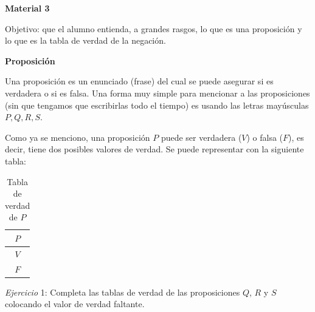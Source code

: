 \documentclass[letterpaper, twoside]{article}
\begin{document}
\begin{center}
  \textbf{\large Material 3}
\end{center}

\vspace{.5cm}

Objetivo: que el alumno entienda, a grandes rasgos, lo que es una proposición y lo que es la tabla de verdad de la negación.

\vspace{.5cm}

\textbf{Proposición}

Una proposición es un enunciado (frase) del cual se puede asegurar si es verdadera o si es falsa. Una forma muy simple para mencionar a las proposiciones (sin que tengamos que escribirlas todo el tiempo) es usando las letras mayúsculas $P,Q,R,S$.\par

\vspace{.5cm}

Como ya se menciono, una proposición $P$ puede ser verdadera ($V$) o falsa ($F$), es decir, tiene dos posibles valores de verdad. Se puede representar con la siguiente tabla:\par

\begin{table}[h]
  \centering
    \begin{tabular}{|c|}
      \hline
      $P$ \\ \hline
      $V$ \\ \hline
      $F$ \\
      \hline
    \end{tabular}
  \caption*{Tabla de verdad de $P$}
\end{table}

\vspace{1cm}

\textit{Ejercicio} 1: Completa las tablas de verdad de las proposiciones $Q$, $R$ y $S$ colocando el valor de verdad faltante.

\vspace{.5cm}
\end{document}
